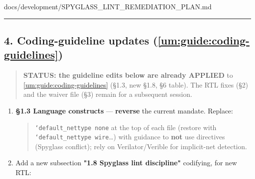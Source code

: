\begin{relocated}{docs/development/SPYGLASS_LINT_REMEDIATION_PLAN.md}
{}

\begin{center}\rule{0.5\linewidth}{0.5pt}\end{center}

\subsection{\texorpdfstring{4. Coding-guideline updates
(\cref{um:guide:coding-guidelines})}{4. Coding-guideline updates ()}}\label{um:guide:spyglass-lint-remediation:4-coding-guideline-updates-docsdevelopmentcoding-guidelinesmd}

\begin{quote}
\textbf{STATUS: the guideline edits below are already APPLIED} to
\cref{um:guide:coding-guidelines} (§1.3, new §1.8, §6 table). The RTL fixes
(§2) and the waiver file (§3) remain for a subsequent session.
\end{quote}

\begin{enumerate}
\def\labelenumi{\arabic{enumi}.}
\tightlist
\item
  \textbf{§1.3 Language constructs} --- \textbf{reverse} the current
  mandate. Replace:

  \begin{quote}
  \texttt{`default\_\allowbreak{}nettype\ none} at the top of each file
  (restore with \texttt{`default\_\allowbreak{}nettype\ wire}\ldots)
  with guidance to \textbf{not} use  directives
  (Spyglass  conflict); rely on Verilator/\allowbreak{}Verible
  for implicit-net detection.
  \end{quote}
\item
  Add a new subsection \textbf{"1.8 Spyglass lint discipline"}
  codifying, for new RTL:


\end{enumerate}
\end{relocated}

